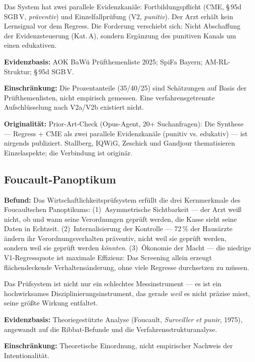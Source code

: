 \documentclass{umbruch-position}
\begin{document}
Das System hat zwei parallele Evidenzkan\"ale: Fortbildungspflicht (CME, \S\,95d SGB\,V, \textit{pr\"aventiv}) und Einzelfallpr\"ufung (V2, \textit{punitiv}). Der Arzt erh\"alt kein Lernsignal vor dem Regress. Die Forderung verschiebt sich: Nicht Abschaffung der Evidenzsteuerung (Kat.\,A), sondern Erg\"anzung des punitiven Kanals um einen edukativen.

\textbf{Evidenzbasis:} AOK BaW\"u Pr\"ufthemenliste 2025; SpiFa Bayern; AM-RL-Struktur; \S\,95d SGB\,V.

\textbf{Einschr\"ankung:} Die Prozentanteile (35/40/25) sind Sch\"atzungen auf Basis der Pr\"ufthemenlisten, nicht empirisch gemessen. Eine verfahrensgetrennte Aufschl\"usselung nach V2a/V2b existiert nicht.

\textbf{Originalit\"at:} Prior-Art-Check (Opus-Agent, 20+ Suchanfragen): Die Synthese --- Regress + CME als zwei parallele Evidenzkan\"ale (punitiv vs. edukativ) --- ist nirgends publiziert. Stallberg, IQWiG, Zeschick und Gandjour thematisieren Einzelaspekte; die Verbindung ist origin\"ar.

\subsection{Foucault-Panoptikum}

\textbf{Befund:} Das Wirtschaftlichkeitspr\"ufsystem erf\"ullt die drei Kernmerkmale des Foucaultschen Panoptikums: (1)~Asymmetrische Sichtbarkeit --- der Arzt wei\ss{} nicht, ob und wann seine Verordnungen gepr\"uft werden, die Kasse sieht seine Daten in Echtzeit. (2)~Internalisierung der Kontrolle --- 72\,\% der Haus\"arzte \"andern ihr Verordnungsverhalten pr\"aventiv, nicht weil sie gepr\"uft werden, sondern weil sie gepr\"uft werden \textit{k\"onnten}. (3)~\"Okonomie der Macht --- die niedrige V1-Regressquote ist maximale Effizienz: Das Screening allein erzeugt fl\"achendeckende Verhaltens\"anderung, ohne viele Regresse durchsetzen zu m\"ussen.

Das Pr\"ufsystem ist nicht nur ein schlechtes Messinstrument --- es ist ein hochwirksames Disziplinierungsinstrument, das gerade \textit{weil} es nicht pr\"azise misst, seine gr\"o\ss{}te Wirkung entfaltet.

\textbf{Evidenzbasis:} Theoriegest\"utzte Analyse (Foucault, \textit{Surveiller et punir}, 1975), angewandt auf die Ribbat-Befunde und die Verfahrensstrukturanalyse.

\textbf{Einschr\"ankung:} Theoretische Einordnung, nicht empirischer Nachweis der Intentionalit\"at.
\end{document}
